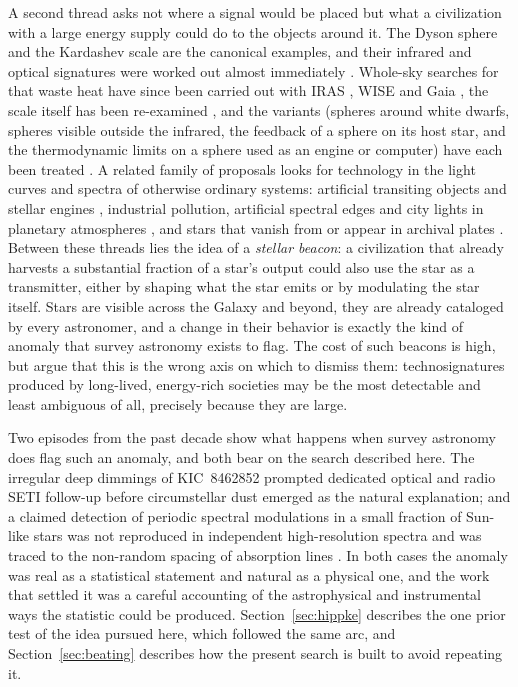 \documentclass[final,5p]{elsarticle}
\begin{document}
A second thread asks not where a signal would be placed but what a civilization with a large energy supply could do to the objects around it. The Dyson sphere \citep{Dyson1960} and the Kardashev scale \citep{Kardashev1964} are the canonical examples, and their infrared and optical signatures were worked out almost immediately \citep{Sagan1966, Shklovskii1966}. Whole-sky searches for that waste heat have since been carried out with IRAS \citep{Carrigan2009}, WISE \citep{Wright2014ghat, Garrett2015, Lacki2019, Chen2021} and Gaia \citep{Zackrisson2018, Suazo2022, Suazo2024}, the scale itself has been re-examined \citep{Cirkovic2015, Wright2020dyson}, and the variants (spheres around white dwarfs, spheres visible outside the infrared, the feedback of a sphere on its host star, and the thermodynamic limits on a sphere used as an engine or computer) have each been treated \citep{Semiz2015, Osmanov2018, Huston2022, Wright2023thermo}. A related family of proposals looks for technology in the light curves and spectra of otherwise ordinary systems: artificial transiting objects and stellar engines \citep{Arnold2005, Forgan2013, Korpela2015, Wright2016megastructures}, industrial pollution, artificial spectral edges and city lights in planetary atmospheres \citep{Lin2014, Lingam2017, Beatty2022, HaqqMisra2022}, and stars that vanish from or appear in archival plates \citep{Villarroel2016}. Between these threads lies the idea of a \emph{stellar beacon}: a civilization that already harvests a substantial fraction of a star's output could also use the star as a transmitter, either by shaping what the star emits \citep{Wright2016megastructures} or by modulating the star itself. Stars are visible across the Galaxy and beyond, they are already cataloged by every astronomer, and a change in their behavior is exactly the kind of anomaly that survey astronomy exists to flag. The cost of such beacons is high, but \citet{Wright2022case} argue that this is the wrong axis on which to dismiss them: technosignatures produced by long-lived, energy-rich societies may be the most detectable and least ambiguous of all, precisely because they are large.

Two episodes from the past decade show what happens when survey astronomy does flag such an anomaly, and both bear on the search described here. The irregular deep dimmings of KIC~8462852 \citep{Boyajian2016} prompted dedicated optical and radio SETI follow-up \citep{Schuetz2016, Lipman2019} before circumstellar dust emerged as the natural explanation; and a claimed detection of periodic spectral modulations in a small fraction of Sun-like stars \citep{Borra2016} was not reproduced in independent high-resolution spectra \citep{Isaacson2019} and was traced to the non-random spacing of absorption lines \citep{Hippke2019lines}. In both cases the anomaly was real as a statistical statement and natural as a physical one, and the work that settled it was a careful accounting of the astrophysical and instrumental ways the statistic could be produced. Section~\ref{sec:hippke} describes the one prior test of the idea pursued here, which followed the same arc, and Section~\ref{sec:beating} describes how the present search is built to avoid repeating it.
\end{document}
